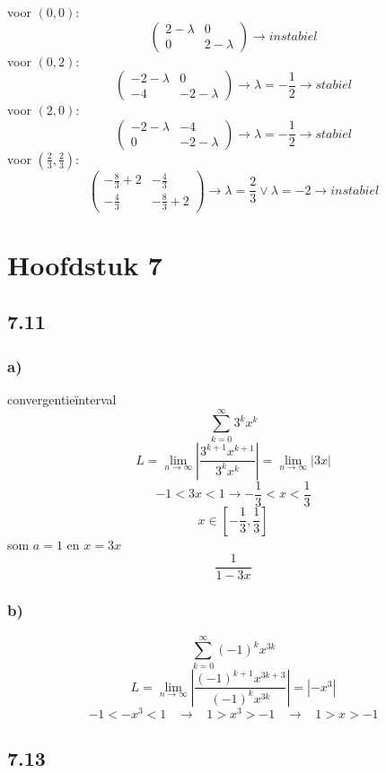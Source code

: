 \documentclass[11pt]{article}
\begin{document}
voor $(0,0)$:
\[
\begin{pmatrix}
2-\lambda & 0 \\
0 & 2-\lambda
\end{pmatrix}
\longrightarrow
instabiel
\]
voor $(0,2)$:
\[
\begin{pmatrix}
-2-\lambda & 0 \\
-4 & -2-\lambda
\end{pmatrix}
\longrightarrow
\lambda = -\frac{1}{2}
\longrightarrow
stabiel
\]
voor $(2,0)$:
\[
\begin{pmatrix}
-2-\lambda & -4 \\
0 & -2-\lambda
\end{pmatrix}
\longrightarrow
\lambda = -\frac{1}{2}
\longrightarrow
stabiel
\]
voor $(\frac{2}{3},\frac{2}{3})$:
\[
\begin{pmatrix}
-\frac{8	}{3}+2 & -\frac{4}{3}\\
-\frac{4}{3} & -\frac{8}{3}+2
\end{pmatrix}
\longrightarrow
\lambda = \frac{2}{3} \vee \lambda=-2
\longrightarrow
instabiel
\]

\section*{Hoofdstuk 7}
\subsection*{7.11}
\subsubsection*{a)}
convergentieïnterval
\[
\sum_{k=0}^{\infty}3^kx^k
\]
\[
L = \lim_{n\rightarrow\infty}\left|\frac{3^{k+1}x^{k+1}}{3^kx^k}\right| = \lim_{n\rightarrow\infty}\left|3x\right|
\]
\[
-1 < 3x < 1 \rightarrow -\frac{1}{3} < x < \frac{1}{3}
\]
\[
x \in \left[ -\frac{1}{3},\frac{1}{3} \right]
\]
som $a=1$ en $x=3x$
\[
\frac{1}{1-3x}
\]

\subsubsection*{b)}
\[
\sum_{k=0}^\infty(-1)^kx^{3k}
\]
\[
L 
=
\lim_{n\rightarrow\infty}\left|\frac{(-1)^{k+1}x^{3k+3}}{(-1)^kx^{3k}}\right|
=
|-x^3|
\]
\[
-1 < -x^3 <1 
\;\;\;\longrightarrow\;\;\;
 1>x^3 > -1
 \;\;\;\longrightarrow\;\;\;
 1 > x > -1
\]

\subsection*{7.13}
\end{document}
